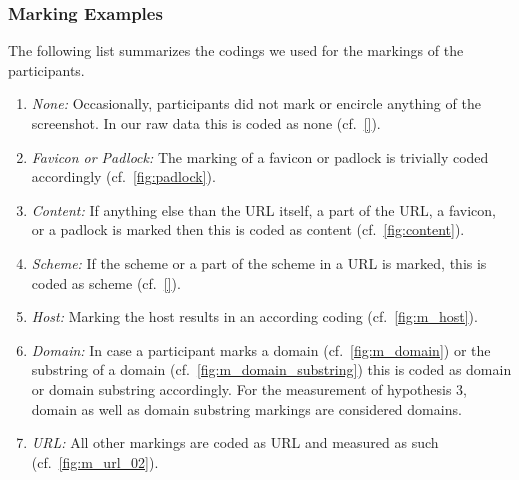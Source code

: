 \subsubsection{Marking Examples}
The following list summarizes the codings we used for the markings of the participants.

\begin{enumerate}
	\item\textit{None:} Occasionally, participants did not mark or encircle anything of the screenshot. In our raw data this is coded as none (cf.~\autoref{}).
	\item\textit{Favicon or Padlock:} The marking of a favicon or padlock is trivially coded accordingly (cf.~\autoref{fig:padlock}).
	\item\textit{Content:} If anything else than the URL itself, a part of the URL, a favicon, or a padlock is marked then this is coded as content (cf.~\autoref{fig:content}).
	\item\textit{Scheme:} If the scheme or a part of the scheme in a URL is marked, this is coded as scheme (cf.~\autoref{}).
	\item\textit{Host:} Marking the host results in an according coding (cf.~\autoref{fig:m_host}).
	\item\textit{Domain:} In case a participant marks a domain (cf.~\autoref{fig:m_domain}) or the substring of a domain (cf.~\autoref{fig:m_domain_substring}) this is coded as domain or domain substring accordingly.
For the measurement of hypothesis 3, domain as well as domain substring markings are considered domains.
	\item\textit{URL:} All other markings are coded as URL and measured as such (cf.~\autoref{fig:m_url_02}).
\end{enumerate}

